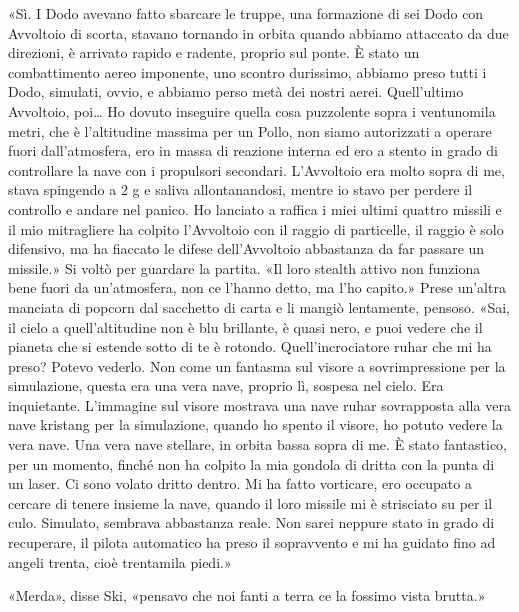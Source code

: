 «Sì. I Dodo avevano fatto sbarcare le truppe, una formazione di sei Dodo
con Avvoltoio di scorta, stavano tornando in orbita quando abbiamo
attaccato da due direzioni, è arrivato rapido e radente, proprio sul
ponte. È stato un combattimento aereo imponente, uno scontro durissimo,
abbiamo preso tutti i Dodo, simulati, ovvio, e abbiamo perso metà dei
nostri aerei. Quell'ultimo Avvoltoio, poi\ldots{} Ho dovuto inseguire
quella cosa puzzolente sopra i ventunomila metri, che è l'altitudine
massima per un Pollo, non siamo autorizzati a operare fuori
dall'atmosfera, ero in massa di reazione interna ed ero a stento in
grado di controllare la nave con i propulsori secondari. L'Avvoltoio era
molto sopra di me, stava spingendo a 2 g e saliva allontanandosi, mentre
io stavo per perdere il controllo e andare nel panico. Ho lanciato a
raffica i miei ultimi quattro missili e il mio mitragliere ha colpito
l'Avvoltoio con il raggio di particelle, il raggio è solo difensivo, ma
ha fiaccato le difese dell'Avvoltoio abbastanza da far passare un
missile.» Si voltò per guardare la partita. «Il loro stealth attivo non
funziona bene fuori da un'atmosfera, non ce l'hanno detto, ma l'ho
capito.» Prese un'altra manciata di popcorn dal sacchetto di carta e li
mangiò lentamente, pensoso. «Sai, il cielo a quell'altitudine non è blu
brillante, è quasi nero, e puoi vedere che il pianeta che si estende
sotto di te è rotondo. Quell'incrociatore ruhar che mi ha preso? Potevo
vederlo. Non come un fantasma sul visore a sovrimpressione per la
simulazione, questa era una vera nave, proprio lì, sospesa nel cielo.
Era inquietante. L'immagine sul visore mostrava una nave ruhar
sovrapposta alla vera nave kristang per la simulazione, quando ho spento
il visore, ho potuto vedere la vera nave. Una vera nave stellare, in
orbita bassa sopra di me. È stato fantastico, per un momento, finché non
ha colpito la mia gondola di dritta con la punta di un laser. Ci sono
volato dritto dentro. Mi ha fatto vorticare, ero occupato a cercare di
tenere insieme la nave, quando il loro missile mi è strisciato su per il
culo. Simulato, sembrava abbastanza reale. Non sarei neppure stato in
grado di recuperare, il pilota automatico ha preso il sopravvento e mi
ha guidato fino ad angeli trenta, cioè trentamila piedi.»

«Merda», disse Ski, «pensavo che noi fanti a terra ce la fossimo vista
brutta.»

